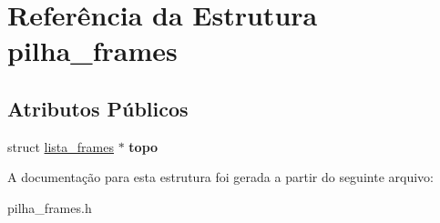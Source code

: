 \hypertarget{structpilha__frames}{}\section{Referência da Estrutura pilha\+\_\+frames}
\label{structpilha__frames}
\subsection*{Atributos Públicos}
\begin{DoxyCompactItemize}
\item 
\mbox{\label{structpilha__frames_a0f1e93df36de953f6ee6789cea5fd34f}} 
struct \hyperlink{structlista__frames}{lista\+\_\+frames} $\ast$ {\bfseries topo}
\end{DoxyCompactItemize}


A documentação para esta estrutura foi gerada a partir do seguinte arquivo\+:\begin{DoxyCompactItemize}
\item 
pilha\+\_\+frames.\+h\end{DoxyCompactItemize}
